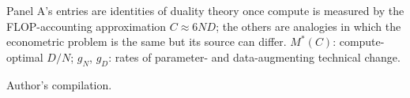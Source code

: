 \begin{table}[tp]
\begin{tabular}{@{}>{\raggedright\arraybackslash}p{24mm}>{\raggedright\arraybackslash}p{29mm}>{\raggedright\arraybackslash}p{50mm}>{\raggedright\arraybackslash}p{24mm}@{}}
\bottomrule
\end{tabular}
\par\smallskip
\begin{tablenotes}
Panel A's entries are identities of duality theory once compute is measured by the FLOP-accounting approximation
$C\approx6ND$; the others are analogies in which the econometric problem is the same but its source can differ.
$M^*(C)$: compute-optimal $D/N$; $g_N$, $g_D$: rates of parameter- and data-augmenting technical change.
\end{tablenotes}
\begin{tablenotes}[Source]
Author's compilation.
\end{tablenotes}
\end{table}
